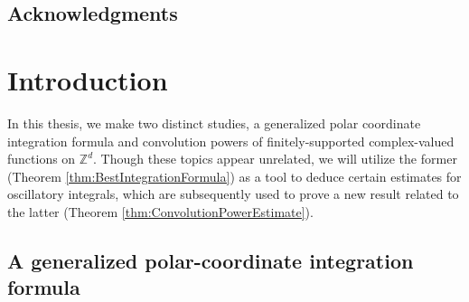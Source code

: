 \documentclass[11pt, letter]{book}
\begin{document}
\newpage
\section*{Acknowledgments} 



\tableofcontents

\listoffigures




\chapter{Introduction}\label{chap:intro}


In this thesis, we make two distinct studies, a generalized polar coordinate integration formula and convolution powers of finitely-supported complex-valued functions on $\mathbb{Z}^d$. Though these topics appear unrelated, we will utilize the former (Theorem \ref{thm:BestIntegrationFormula}) as a tool to deduce certain estimates for oscillatory integrals, which are subsequently used to prove a new result related to the latter  (Theorem \ref{thm:ConvolutionPowerEstimate}).



\section{A generalized polar-coordinate integration formula}
\end{document}
